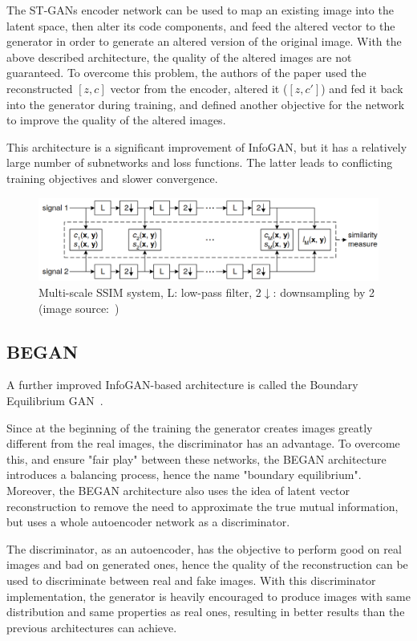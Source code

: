 \documentclass{egpubl}
\begin{document}
The ST-GANs encoder network can be used to map an existing image into the latent space, then alter its code components, and feed the altered vector to the generator in order to generate an altered version of the original image. With the above described architecture, the quality of the altered images are not guaranteed. To overcome this problem, the authors of the paper used the reconstructed $[z,c]$ vector from the encoder, altered it ($[z,c']$) and fed it back into the generator during training, and defined another objective for the network to improve the quality of the altered images.

This architecture is a significant improvement of InfoGAN, but it has a relatively large number of subnetworks and loss functions. The latter leads to conflicting training objectives and slower convergence.

\begin{figure}[!htb]
	\centering
	\includegraphics[width=\textwidth]{pic/MS-SSIM}
	\caption{Multi-scale SSIM system, L: low-pass filter, 2$\downarrow$: downsampling by 2 (image source:~\cite{1292216})}
	\label{fig:ms_ssim}
\end{figure}


\subsection{BEGAN}
\label{sec:digErr}

A further improved InfoGAN-based architecture is called the Boundary Equilibrium GAN~\cite{berthelot2017began}.

Since at the beginning of the training the generator creates images greatly different from the real images, the discriminator has an advantage. To overcome this, and ensure "fair play" between these networks, the BEGAN architecture introduces a balancing process, hence the name "boundary equilibrium".
Moreover, the BEGAN architecture also uses the idea of latent vector reconstruction to remove the need to approximate the true mutual information, but uses a whole autoencoder network as a discriminator.

The discriminator, as an autoencoder, has the objective to perform good on real images and bad on generated ones, hence the quality of the reconstruction can be used to discriminate between real and fake images. With this discriminator implementation, the generator is heavily encouraged to produce images with same distribution and same properties as real ones, resulting in better results than the previous architectures can achieve.
\end{document}
